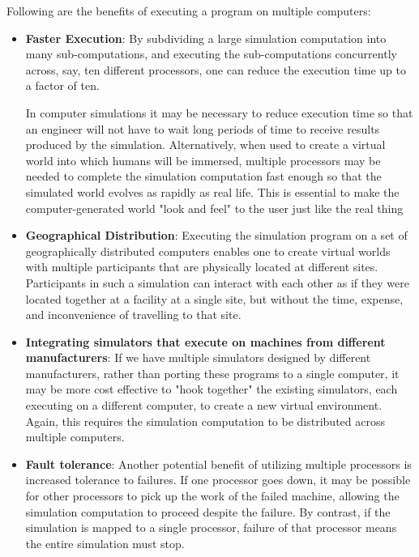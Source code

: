 \documentclass[12pt,a4paper]{article}
\begin{document}
	Following are the benefits of executing a program on multiple computers:
	\begin{itemize}
		\item \textbf{Faster Execution}: By subdividing a large simulation computation into many sub-computations, and executing the sub-computations concurrently across, say, ten different processors, one can reduce the execution time up to a factor of ten.
		
		In computer simulations it may be necessary to reduce execution time so that an engineer will not have to wait long periods of time to receive results produced by the simulation. Alternatively, when used to create a virtual world into which humans will be immersed, multiple processors may be needed to complete the simulation computation fast enough so that the simulated world evolves as rapidly as real life. This is essential to make the computer-generated world "look and feel" to the user just like the real thing
		
		\item \textbf{Geographical Distribution}: Executing the simulation program on a set of geographically distributed computers enables one to create virtual worlds with multiple participants that are physically located at different sites. Participants in such a simulation can interact with each other as if they were located together at a facility at a single site, but without the time, expense, and inconvenience of travelling to that site.
				
		\item \textbf{Integrating simulators that execute on machines from different manufacturers}: If we have multiple simulators designed by different manufacturers, rather than porting these programs to a single computer, it may be more cost effective to "hook together" the existing simulators, each executing on a different computer, to create a new virtual environment. Again, this requires the simulation computation to be distributed across multiple computers.
		
		\item \textbf{Fault tolerance}: Another potential benefit of utilizing multiple processors is increased tolerance to failures. If one processor goes down, it may be possible for other processors to pick up the work of the failed machine, allowing the simulation computation to proceed despite the failure. By contrast, if the simulation is mapped to a single processor, failure of that processor means the entire simulation must stop. 
	\end{itemize}
	
\end{document}
